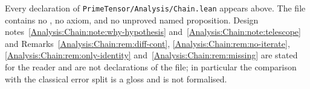 \noindent
Every declaration of \texttt{PrimeTensor/Analysis/Chain.lean} appears above.
The file contains no , no axiom, and no unproved named proposition.
Design notes~\ref{Analysis:Chain:note:why-hypothesis}
and~\ref{Analysis:Chain:note:telescope} and
Remarks~\ref{Analysis:Chain:rem:diff-cont},
\ref{Analysis:Chain:rem:no-iterate}, \ref{Analysis:Chain:rem:only-identity}
and~\ref{Analysis:Chain:rem:missing} are stated for the reader and are not
declarations of the file; in particular the comparison with the classical
error split is a gloss and is not formalised.
